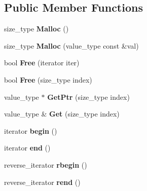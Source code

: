 \subsection*{Public Member Functions}
\begin{DoxyCompactItemize}
\item 
\hypertarget{classlsf_1_1container_1_1Pool_a8702b4894e4958874c8fa6d2749e3f08}{
size\_\-type {\bfseries Malloc} ()}
\label{classlsf_1_1container_1_1Pool_a8702b4894e4958874c8fa6d2749e3f08}

\item 
\hypertarget{classlsf_1_1container_1_1Pool_af10b513edcfc52ce510a99f4d6d0ab64}{
size\_\-type {\bfseries Malloc} (value\_\-type const \&val)}
\label{classlsf_1_1container_1_1Pool_af10b513edcfc52ce510a99f4d6d0ab64}

\item 
\hypertarget{classlsf_1_1container_1_1Pool_aa818a3fc20d5e226e7cfc277558c2016}{
bool {\bfseries Free} (iterator iter)}
\label{classlsf_1_1container_1_1Pool_aa818a3fc20d5e226e7cfc277558c2016}

\item 
\hypertarget{classlsf_1_1container_1_1Pool_a864a4b97f08d176d5d888de55a0fa8ed}{
bool {\bfseries Free} (size\_\-type index)}
\label{classlsf_1_1container_1_1Pool_a864a4b97f08d176d5d888de55a0fa8ed}

\item 
\hypertarget{classlsf_1_1container_1_1Pool_a558a0e034a509980e556fedaf265b718}{
value\_\-type $\ast$ {\bfseries GetPtr} (size\_\-type index)}
\label{classlsf_1_1container_1_1Pool_a558a0e034a509980e556fedaf265b718}

\item 
\hypertarget{classlsf_1_1container_1_1Pool_a65d83c34ce0b39c2266c554e6693e82c}{
value\_\-type \& {\bfseries Get} (size\_\-type index)}
\label{classlsf_1_1container_1_1Pool_a65d83c34ce0b39c2266c554e6693e82c}

\item 
\hypertarget{classlsf_1_1container_1_1Pool_a005d44abeaa9f2be0131d81a34f98ee9}{
iterator {\bfseries begin} ()}
\label{classlsf_1_1container_1_1Pool_a005d44abeaa9f2be0131d81a34f98ee9}

\item 
\hypertarget{classlsf_1_1container_1_1Pool_a17dcb30ef72e7effff0db5d0035a0f3a}{
iterator {\bfseries end} ()}
\label{classlsf_1_1container_1_1Pool_a17dcb30ef72e7effff0db5d0035a0f3a}

\item 
\hypertarget{classlsf_1_1container_1_1Pool_afdeca45a728b1a59107dfd989f00b6be}{
reverse\_\-iterator {\bfseries rbegin} ()}
\label{classlsf_1_1container_1_1Pool_afdeca45a728b1a59107dfd989f00b6be}

\item 
\hypertarget{classlsf_1_1container_1_1Pool_a0428bb678272d1faf6d9b1302de7c56c}{
reverse\_\-iterator {\bfseries rend} ()}
\label{classlsf_1_1container_1_1Pool_a0428bb678272d1faf6d9b1302de7c56c}

\end{DoxyCompactItemize}
